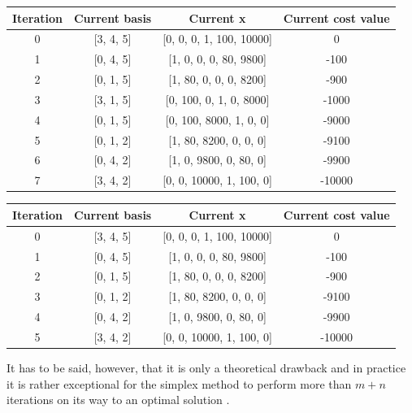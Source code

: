 \documentclass[a4paper,10 pt,titlepage,twoside]{book}
\theoremstyle{plain}
\theoremstyle{definition}
\theoremstyle{remark}
\begin{document}
\begin{table}[h]
	\begin{center}
	\begin{tabular}{|c|c|c|c|}
		\hline
		\textbf{Iteration} & \textbf{Current basis} & \textbf{Current x} & \textbf{Current cost value} \\ \hline
		0 & [3, 4, 5] & [0, 0, 0, 1, 100, 10000] & 0 \\ \hline
		1 & [0, 4, 5] & [1, 0, 0, 0, 80, 9800] & -100 \\ \hline
		2 & [0, 1, 5] & [1, 80, 0, 0, 0, 8200] & -900 \\ \hline
		3 & [3, 1, 5] & [0, 100, 0, 1, 0, 8000] & -1000 \\ \hline
		4 & [0, 1, 5] & [0, 100, 8000, 1, 0, 0] & -9000 \\ \hline
		5 & [0, 1, 2] & [1, 80, 8200, 0, 0, 0] & -9100 \\ \hline
		6 & [0, 4, 2] & [1, 0, 9800, 0, 80, 0] & -9900 \\ \hline
		7 & [3, 4, 2] & [0, 0, 10000, 1, 100, 0] & -10000 \\ \hline
	\end{tabular}
\end{center}
\end{table}

\begin{table}[h]
	\begin{center}
		\begin{tabular}{|c|c|c|c|}
			\hline
			\textbf{Iteration} & \textbf{Current basis} & \textbf{Current x} & \textbf{Current cost value} \\ \hline
			0 & [3, 4, 5] & [0, 0, 0, 1, 100, 10000] & 0 \\ \hline
			1 & [0, 4, 5] & [1, 0, 0, 0, 80, 9800] & -100 \\ \hline
			2 & [0, 1, 5] & [1, 80, 0, 0, 0, 8200] & -900 \\ \hline
			3 & [0, 1, 2] & [1, 80, 8200, 0, 0, 0] & -9100 \\ \hline
			4 & [0, 4, 2] & [1, 0, 9800, 0, 80, 0] & -9900 \\ \hline
			5 & [3, 4, 2] & [0, 0, 10000, 1, 100, 0] & -10000 \\ \hline
		\end{tabular}
	\end{center}
\end{table}

It has to be said, however, that it is only a theoretical drawback and in practice it is rather exceptional for the simplex method to perform more than $m + n$ iterations on its way to an optimal solution \cite{ComTeq}.
\\
\end{document}
